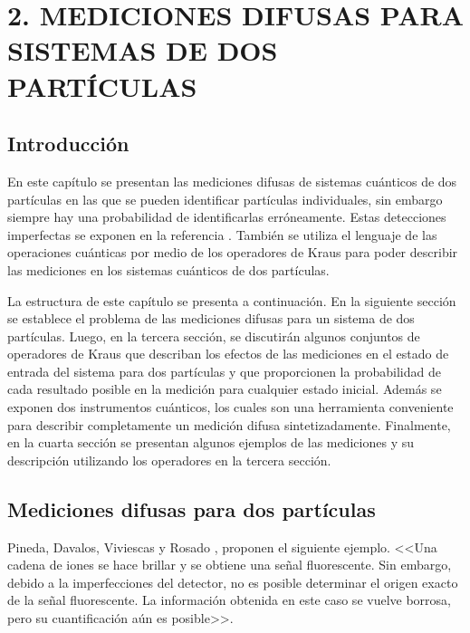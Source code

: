 \chapter[MEDICIONES DIFUSAS PARA SISTEMA DE DOS PARTÍCULAS]{2. MEDICIONES DIFUSAS PARA SISTEMAS DE DOS PARTÍCULAS}

\section{Introducción}
 En este capítulo se presentan las mediciones difusas de sistemas cuánticos de
dos partículas en las que se pueden identificar partículas individuales, sin embargo siempre hay una probabilidad de identificarlas erróneamente. Estas detecciones imperfectas se exponen en la referencia {\cite{Pineda_2021}}. También se utiliza el lenguaje de las operaciones cuánticas por medio de los operadores de Kraus para poder describir las mediciones en los sistemas cuánticos de dos partículas.

La estructura de este capítulo se presenta a continuación. En la siguiente sección se establece el problema de las mediciones difusas para un sistema de dos partículas. Luego, en la tercera sección, se discutirán algunos conjuntos de operadores de Kraus que describan los efectos de las mediciones en el estado de entrada del sistema para dos partículas y que proporcionen la probabilidad de cada resultado posible en la medición para cualquier estado inicial.  Además se exponen dos instrumentos cuánticos, los cuales son una herramienta conveniente para describir completamente un medición difusa sintetizadamente. Finalmente, en la cuarta sección se presentan algunos ejemplos de las mediciones y su descripción utilizando los operadores en la tercera sección.

\section{Mediciones difusas para dos partículas} %

Pineda, Davalos, Viviescas y Rosado {\cite{Pineda_2021}}, proponen el siguiente
ejemplo. <<Una cadena de iones se hace brillar  y se obtiene una señal
fluorescente. Sin embargo, debido a la imperfecciones del detector, no es
posible determinar el origen exacto de la señal fluorescente. La
información obtenida en este caso se vuelve borrosa, pero su cuantificación aún
es posible>>.

